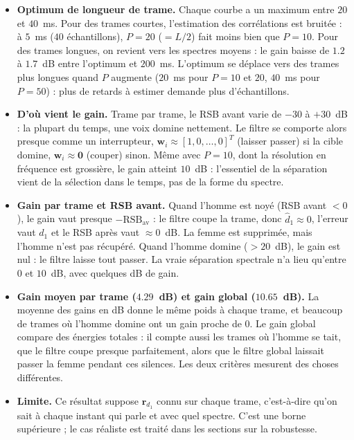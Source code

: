 \begin{interpretation}
\begin{itemize}
  \item \textbf{Optimum de longueur de trame.} Chaque courbe a un maximum entre $20$ et $40$~ms. Pour des trames courtes, l'estimation des corrélations est bruitée : à $5$~ms ($40$ échantillons), $P=20$ ($=L/2$) fait moins bien que $P=10$. Pour des trames longues, on revient vers les spectres moyens : le gain baisse de $1.2$ à $1.7$~dB entre l'optimum et $200$~ms. L'optimum se déplace vers des trames plus longues quand $P$ augmente ($20$~ms pour $P=10$ et $20$, $40$~ms pour $P=50$) : plus de retards à estimer demande plus d'échantillons.
  \item \textbf{D'où vient le gain.} Trame par trame, le RSB avant varie de $-30$ à $+30$~dB : la plupart du temps, une voix domine nettement. Le filtre se comporte alors presque comme un interrupteur, $\mathbf{w}_i\approx[1,0,\dots,0]^T$ (laisser passer) si la cible domine, $\mathbf{w}_i\approx\mathbf{0}$ (couper) sinon. Même avec $P=10$, dont la résolution en fréquence est grossière, le gain atteint $10$~dB : l'essentiel de la séparation vient de la sélection dans le temps, pas de la forme du spectre.
  \item \textbf{Gain par trame et RSB avant.} Quand l'homme est noyé (RSB avant $<0$), le gain vaut presque $-\mathrm{RSB}_{\mathrm{av}}$ : le filtre coupe la trame, donc $\hat d_1\approx 0$, l'erreur vaut $d_1$ et le RSB après vaut $\approx 0$~dB. La femme est supprimée, mais l'homme n'est pas récupéré. Quand l'homme domine ($>20$~dB), le gain est nul : le filtre laisse tout passer. La vraie séparation spectrale n'a lieu qu'entre $0$ et $10$~dB, avec quelques dB de gain.
  \item \textbf{Gain moyen par trame ($4.29$~dB) et gain global ($10.65$~dB).} La moyenne des gains en dB donne le même poids à chaque trame, et beaucoup de trames où l'homme domine ont un gain proche de $0$. Le gain global compare des énergies totales : il compte aussi les trames où l'homme se tait, que le filtre coupe presque parfaitement, alors que le filtre global laissait passer la femme pendant ces silences. Les deux critères mesurent des choses différentes.
  \item \textbf{Limite.} Ce résultat suppose $\mathbf{r}_{d_1}$ connu sur chaque trame, c'est-à-dire qu'on sait à chaque instant qui parle et avec quel spectre. C'est une borne supérieure ; le cas réaliste est traité dans les sections sur la robustesse.
\end{itemize}
\end{interpretation}

